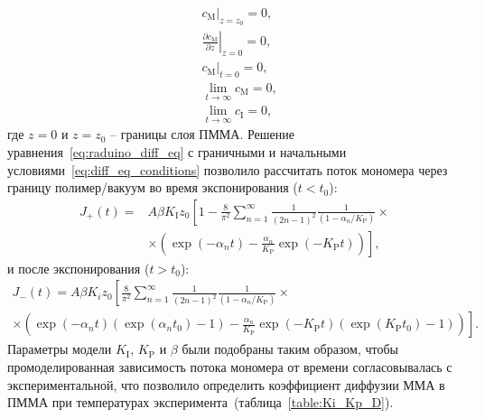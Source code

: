 \begin{equation} \label{eq:diff_eq_conditions}
	\begin{aligned}
		&\left.c_\mathrm{M}\right|_{z=z_0} = 0, \\
		&\left.\frac{\partial c_\mathrm{M}}{\partial z}\right|_{z=0} = 0, \\
		&\left.c_\mathrm{M}\right|_{t=0} = 0, \\
		&\lim _{t \rightarrow \infty} c_\mathrm{M} = 0, \\
		&\lim _{t \rightarrow \infty} c_\mathrm{I} = 0,
	\end{aligned}
\end{equation}
где $z=0$ и $z=z_0$ -- границы слоя ПММА.
Решение уравнения~\ref{eq:raduino_diff_eq} с граничными и начальными условиями~\ref{eq:diff_eq_conditions} позволило рассчитать поток мономера через границу полимер/вакуум во время экспонирования ($t < t_0$):
\begin{equation}
	\begin{aligned}
		J_{+}(t)= & A \beta K_\mathrm{I} z_0
		\left[
		1 - \frac{8}{\pi^2} \sum_{n=1}^{\infty}
		\frac{1}{(2n-1)^2} \frac{1}{(1 - \alpha_n / K_\mathrm{P})} \times \right. \\ & \left.
		\times
		\left(
			\exp (-\alpha_n t)-\frac{\alpha_n}{K_\mathrm{P}} \exp (-K_\mathrm{P} t)
		\right)
		\right],
	\end{aligned}
\end{equation}
и после экспонирования ($t > t_0$):
\begin{equation}
	\begin{aligned}
		J_{-}(t)= A \beta K_i z_0 \left[
			\frac{8}{\pi^2} \sum_{n=1}^{\infty} \frac{1}{(2 n-1)^2} \frac{1}{\left(1-\alpha_n / K_\mathrm{P}\right)}\right. \times \quad \quad \quad \quad \\
	\times \left.
	\left(
	\exp (-\alpha_n t) (\exp (\alpha_n t_0)-1)- \frac{\alpha_n}{K_\mathrm{P}}
	\exp (-K_\mathrm{P} t) (\exp (K_\mathrm{P} t_0)-1)
	\right)
	\right].
	\end{aligned}
\end{equation}
Параметры модели $K_\mathrm{I}$, $K_\mathrm{P}$ и $\beta$ были подобраны таким образом, чтобы промоделированная зависимость потока мономера от времени согласовывалась с экспериментальной, что позволило определить коэффициент диффузии ММА в ПММА при температурах эксперимента~(таблица~\ref{table:Ki_Kp_D}).

